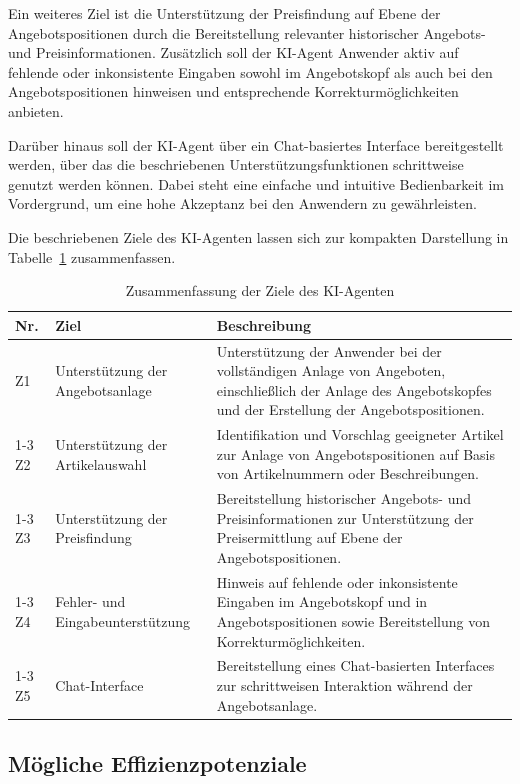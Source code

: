 Ein weiteres Ziel ist die Unterstützung der Preisfindung auf Ebene der Angebotspositionen durch die Bereitstellung relevanter historischer Angebots- und Preisinformationen. Zusätzlich soll der \ac{KI}-Agent Anwender aktiv auf fehlende oder inkonsistente Eingaben sowohl im Angebotskopf als auch bei den Angebotspositionen hinweisen und entsprechende Korrekturmöglichkeiten anbieten.

Darüber hinaus soll der \ac{KI}-Agent über ein Chat-basiertes Interface bereitgestellt werden, über das die beschriebenen Unterstützungsfunktionen schrittweise genutzt werden können. Dabei steht eine einfache und intuitive Bedienbarkeit im Vordergrund, um eine hohe Akzeptanz bei den Anwendern zu gewährleisten.

Die beschriebenen Ziele des \ac{KI}-Agenten lassen sich zur kompakten Darstellung in Tabelle~\ref{tab:ziele-ki-agent} zusammenfassen.

\begin{table}[H]
\centering
\caption{Zusammenfassung der Ziele des KI-Agenten}
\label{tab:ziele-ki-agent}
\begin{tabularx}{\textwidth}{l >{\raggedright\arraybackslash}p{4.2cm} >{\small}X}
\hline
\textbf{Nr.} & \textbf{Ziel} & \textbf{Beschreibung} \\
\hline
Z1 & Unterstützung der Angebotsanlage &
Unterstützung der Anwender bei der vollständigen Anlage von Angeboten, einschließlich der Anlage des Angebotskopfes und der Erstellung der Angebotspositionen. \\
\cline{1-3}
Z2 & Unterstützung der Artikelauswahl &
Identifikation und Vorschlag geeigneter Artikel zur Anlage von Angebotspositionen auf Basis von Artikelnummern oder Beschreibungen. \\
\cline{1-3}
Z3 & Unterstützung der Preisfindung &
Bereitstellung historischer Angebots- und Preisinformationen zur Unterstützung der Preisermittlung auf Ebene der Angebotspositionen. \\
\cline{1-3}
Z4 & Fehler- und Eingabeunterstützung &
Hinweis auf fehlende oder inkonsistente Eingaben im Angebotskopf und in Angebotspositionen sowie Bereitstellung von Korrekturmöglichkeiten. \\
\cline{1-3}
Z5 & Chat-Interface &
Bereitstellung eines Chat-basierten Interfaces zur schrittweisen Interaktion während der Angebotsanlage. \\
\hline
\end{tabularx}
\end{table}


\subsection{Mögliche Effizienzpotenziale}
\label{sec:effizienzpotenziale}

